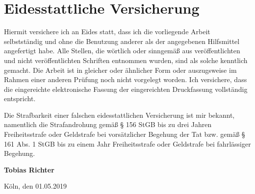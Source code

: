 \documentclass[a4paper, 12pt]{article}
\begin{document}
\section*{Eidesstattliche Versicherung}
\label{sec:SOOA}

\vspace{2.5cm}


Hiermit versichere ich an Eides statt, dass ich die vorliegende Arbeit selbstständig und ohne die Benutzung anderer als der angegebenen Hilfsmittel angefertigt habe. Alle Stellen, die wörtlich oder sinngemäß aus veröffentlichten und nicht veröffentlichten Schriften entnommen wurden, sind als solche kenntlich gemacht. Die Arbeit ist in gleicher oder ähnlicher Form oder auszugsweise im Rahmen einer anderen Prüfung noch nicht vorgelegt worden. Ich versichere, dass die eingereichte elektronische Fassung der eingereichten Druckfassung vollständig entspricht.

\vspace{1cm}

\noindent
Die Strafbarkeit einer falschen eidesstattlichen Versicherung ist mir bekannt, namentlich die Strafandrohung gemäß § 156 StGB bis zu drei Jahren Freiheitsstrafe oder Geldstrafe bei vorsätzlicher Begehung der Tat bzw. gemäß § 161 Abs. 1 StGB bis zu einem Jahr Freiheitsstrafe oder Geldstrafe bei fahrlässiger Begehung.

\vspace{3cm}
\noindent
\textbf{Tobias Richter}

\vspace{0.5cm}
\noindent
Köln, den 01.05.2019
\clearpage
\thispagestyle{empty}
\vspace*{\fill}
\end{document}
